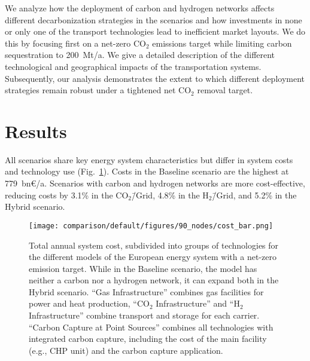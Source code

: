 \documentclass[twocolumn]{article}
\newcommand{\carbon}{CO$_2$}
\newcommand{\hydrogen}{H$_2$}
\newcommand{\carbongrid}{CO$_2$\=/Grid}
\newcommand{\hydrogengrid}{H$_2$\=/Grid}
\newcommand{\baselinescenario}{Baseline scenario}
\newcommand{\hybridscenario}{Hybrid scenario}
\begin{document}
We analyze how the deployment of carbon and hydrogen networks affects different decarbonization strategies in the scenarios and how investments in none or only one of the transport technologies lead to inefficient market layouts. We do this by focusing first on a net-zero \carbon{} emissions target while limiting carbon sequestration to 200~Mt/a. We give a detailed description of the different technological and geographical impacts of the transportation systems. Subsequently, our analysis demonstrates the extent to which different deployment strategies remain robust under a tightened net \carbon{} removal target.


\section{Results}
\label{sec:results}


All scenarios share key energy system characteristics but differ in system costs and technology use (Fig.~\ref{fig:cost_bar}). Costs in the \baselinescenario{} are the highest at 779~bn€/a. Scenarios with carbon and hydrogen networks are more cost-effective, reducing costs by 3.1\% in the \carbongrid{}, 4.8\% in the \hydrogengrid{}, and 5.2\% in the \hybridscenario{}.

\begin{figure}[ht!]
    \centering
    \texttt{[image: comparison/default/figures/90\_nodes/cost\_bar.png]}
    \caption[short]{Total annual system cost, subdivided into groups of technologies for the different models of the European energy system with a net-zero emission target. While in the \baselinescenario{}, the model has neither a carbon nor a hydrogen network, it can expand both in the \hybridscenario{}. ``Gas Infrastructure'' combines gas facilities for power and heat production, ``\carbon{} Infrastructure'' and ``\hydrogen{} Infrastructure'' combine transport and storage for each carrier. ``Carbon Capture at Point Sources'' combines all technologies with integrated carbon capture, including the cost of the main facility (e.g., CHP unit) and the carbon capture application.}
    \label{fig:cost_bar}
\end{figure}

\end{document}
